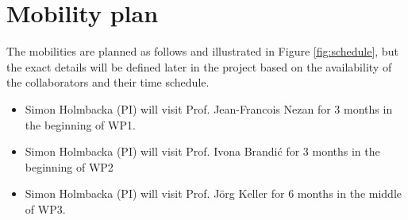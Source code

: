\documentclass{article}
\begin{document}
\section{Mobility plan}
The mobilities are planned as follows and illustrated in Figure \ref{fig:schedule}, but the exact details will be defined later in the project based on the availability of the collaborators and their time schedule.
\begin{itemize}
 \item Simon Holmbacka (PI) will visit Prof. Jean-Francois Nezan for 3 months in the beginning of WP1. \vspace{-0.3cm}
 \item Simon Holmbacka (PI) will visit Prof. Ivona Brandi\'{c} for 3 months in the beginning of WP2 \vspace{-0.3cm}
 \item Simon Holmbacka (PI) will visit Prof. J\"{o}rg Keller for 6 months in the middle of WP3. \vspace{-0.3cm}
\end{itemize}


{\footnotesize
}

\end{document}
